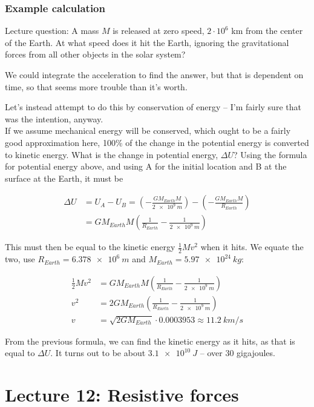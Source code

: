 \subsubsection{Example calculation}

Lecture question: A mass $M$ is released at zero speed, $2 \cdot 10^6$ km from the center of the Earth. At what speed does it hit the Earth, ignoring the gravitational forces from all other objects in the solar system?

We could integrate the acceleration to find the answer, but that is dependent on time, so that seems more trouble than it's worth.

Let's instead attempt to do this by conservation of energy -- I'm fairly sure that was the intention, anyway.\\
If we assume mechanical energy will be conserved, which ought to be a fairly good approximation here, 100\% of the change in the potential energy is converted to kinetic energy. What is the change in potential energy, $\Delta U$? Using the formula for potential energy above, and using A for the initial location and B at the surface at the Earth, it must be

\begin{align}
\Delta U &= U_A - U_B = \left(-\frac{G M_{Earth} M}{\SI{2e9}{m}}\right) - \left(-\frac{G M_{Earth} M}{R_{Earth}}\right)\\
         &= G M_{Earth} M \left( \frac{1}{R_{Earth}} - \frac{1}{\SI{2e9}{m}} \right)
\end{align}

This must then be equal to the kinetic energy $\displaystyle \frac{1}{2} M v^2$ when it hits. We equate the two, use $R_{Earth} = \SI{6.378e6}{m}$ and $M_{Earth} = \SI{5.97e24}{kg}$:

\begin{align}
\frac{1}{2} M v^2 &= G M_{Earth} M \left( \frac{1}{R_{Earth}} - \frac{1}{\SI{2e9}{m}} \right)\\
v^2 &= 2 G M_{Earth} \left( \frac{1}{R_{Earth}} - \frac{1}{\SI{2e9}{m}} \right)\\
v &= \sqrt{2 G M_{Earth}} \cdot 0.0003953 \approx \SI{11.2}{km/s}
\end{align}

From the previous formula, we can find the kinetic energy as it hits, as that is equal to $\Delta U$. It turns out to be about $\SI{3.1e10}{J}$ -- over 30 gigajoules.

\section{Lecture 12: Resistive forces}

